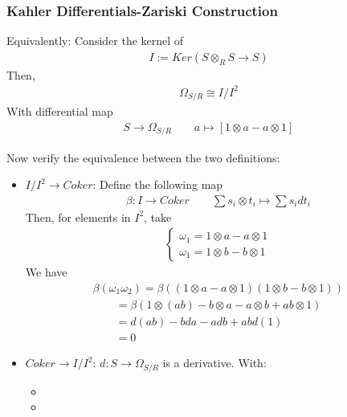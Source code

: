 \documentclass[Total.tex]{subfiles}
\begin{document}
		\subsubsection{Kahler Differentials-Zariski Construction}
			\begin{Def}
				Equivalently: Consider the kernel of
				\begin{gather*}
					I:=Ker(S\otimes_R S\rightarrow S)
				\end{gather*}
				Then,
				\begin{gather*}
					\Omega_{S/R}\cong I/I^2
				\end{gather*}
				With differential map
				\begin{gather*}
					S\rightarrow \Omega_{S/R}\qquad a\mapsto [1\otimes a-a\otimes 1]
				\end{gather*}
			\end{Def}
			Now verify the equivalence between the two definitions:
			\begin{itemize}
				\item $I/I^2\rightarrow Coker$: Define the following map
				\begin{gather*}
					\beta:I\rightarrow Coker\qquad \sum s_i\otimes t_i\mapsto \sum s_i dt_i
				\end{gather*}
				Then, for elements in $I^2$, take 
				\begin{gather*}
					\begin{cases}
						\omega_1=1\otimes a-a\otimes 1\\
						\omega_1=1\otimes b-b\otimes 1
					\end{cases}
				\end{gather*}
				We have
				\begin{gather*}
					\beta(\omega_1\omega_2)=\beta((1\otimes a-a\otimes 1)(1\otimes b-b\otimes 1))\\
					\qquad=\beta(1\otimes (ab)-b\otimes a-a\otimes b+ab\otimes 1)\\
					\qquad=d(ab)-bda-adb+abd(1)\\
					\qquad=0
				\end{gather*}
				\item $Coker\rightarrow I/I^2$:  $d:S\rightarrow \Omega_{S/R}$ is a derivative. With:
				\begin{itemize}
					\item 
					\item 
				\end{itemize}
			\end{itemize}
		
\end{document}
